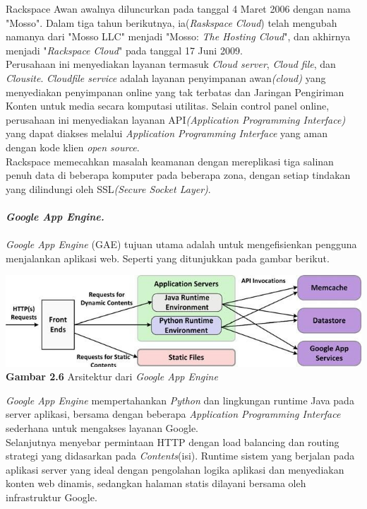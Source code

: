Rackspace Awan awalnya diluncurkan pada tanggal 4 Maret 2006 dengan nama "Mosso". Dalam tiga tahun berikutnya, ia(\textit{Raskspace Cloud}) telah mengubah namanya dari "Mosso LLC" menjadi "Mosso: \textit{The Hosting Cloud}", dan akhirnya menjadi "\textit{Rackspace Cloud}" pada  tanggal  17 Juni 2009.\\
\tab Perusahaan  ini  menyediakan layanan  termasuk   \textit{Cloud server},   \textit{Cloud  file},   dan  \textit{Clousite}. \textit{Cloudfile service} adalah layanan penyimpanan awan\textit{(cloud)} yang menyediakan penyimpanan  online yang tak  terbatas  dan  Jaringan Pengiriman  Konten  untuk media  secara komputasi utilitas. Selain control panel online, perusahaan ini menyediakan layanan API\textit{(Application Programming Interface)} yang dapat diakses melalui \textit{Application Programming Interface} yang aman dengan kode klien \textit{open source}.\\
Rackspace memecahkan masalah keamanan dengan mereplikasi tiga salinan penuh data di beberapa komputer pada beberapa zona, dengan setiap tindakan yang dilindungi oleh SSL\textit{(Secure Socket Layer)}.\\\\
\textbf{\textit{Google App Engine.}}\\\\
\textit{Google App Engine} (GAE) tujuan utama adalah untuk mengefisienkan pengguna menjalankan aplikasi web. Seperti yang ditunjukkan pada gambar berikut.\\
\begin{center}
\includegraphics[scale=1]{gambar26.jpg} \\
\textbf{Gambar  2.6} Arsitektur dari \textit{Google App Engine}
\end{center}
\textit{Google App Engine} mempertahankan \textit{Python} dan lingkungan runtime Java  pada  server aplikasi, bersama dengan beberapa \textit{Application Programming Interface} sederhana untuk mengakses layanan Google.\\
\tab Selanjutnya menyebar permintaan HTTP dengan load balancing dan  routing  strategi yang didasarkan pada \textit{Contents}(isi). Runtime sistem yang berjalan pada aplikasi server yang ideal dengan pengolahan logika aplikasi dan menyediakan konten web dinamis, sedangkan halaman statis dilayani  bersama oleh infrastruktur Google.\\
